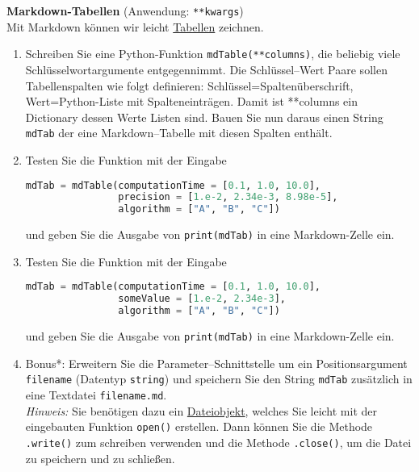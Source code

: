  \textbf{Markdown-Tabellen} (Anwendung: \texttt{**kwargs})\\
 Mit Markdown können wir leicht \href{https://www.tablesgenerator.com/markdown_tables}{Tabellen} zeichnen. 
\begin{enumerate}
\item Schreiben Sie eine Python-Funktion
\verb|mdTable(**columns)|, die beliebig viele Schlüsselwortargumente entgegennimmt. Die Schlüssel--Wert Paare sollen Tabellenspalten wie folgt definieren: Schlüssel=Spaltenüberschrift, Wert=Python-Liste mit Spalteneinträgen. Damit ist **columns ein Dictionary dessen Werte Listen sind. Bauen Sie nun daraus einen String \texttt{mdTab} der eine Markdown--Tabelle mit diesen Spalten enthält. 
\item Testen Sie die Funktion mit der Eingabe
\begin{lstlisting}[language=Python]
mdTab = mdTable(computationTime = [0.1, 1.0, 10.0], 
                precision = [1.e-2, 2.34e-3, 8.98e-5], 
                algorithm = ["A", "B", "C"])
\end{lstlisting}
und geben Sie die Ausgabe von \texttt{print(mdTab)} in eine Markdown-Zelle ein.

\item Testen Sie die Funktion mit der Eingabe
\begin{lstlisting}[language=Python]
mdTab = mdTable(computationTime = [0.1, 1.0, 10.0], 
                someValue = [1.e-2, 2.34e-3], 
                algorithm = ["A", "B", "C"])
\end{lstlisting}
und geben Sie die Ausgabe von \texttt{print(mdTab)} in eine Markdown-Zelle ein.

\item Bonus*: Erweitern Sie die Parameter--Schnittstelle um ein Positionsargument \texttt{filename} (Datentyp \texttt{string}) und speichern Sie den String \texttt{mdTab} zusätzlich in eine Textdatei \texttt{filename.md}.\\ 
\textit{Hinweis:} Sie benötigen dazu ein \href{https://docs.python.org/3/tutorial/inputoutput.html#reading-and-writing-files}{Dateiobjekt}, welches Sie leicht mit der eingebauten Funktion \texttt{open()} erstellen. Dann können Sie die Methode \texttt{.write()} zum schreiben verwenden und die Methode \texttt{.close()}, um die Datei zu speichern und zu schließen.
\end{enumerate}